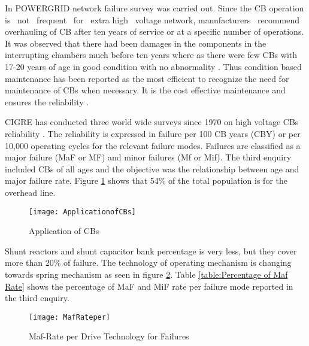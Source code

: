 In POWERGRID network failure survey was carried out. Since the CB operation is~ not~ frequent~ for~ extra high~ voltage network, manufacturers~ recommend overhauling of CB after ten years of service or at a specific number of operations. It was observed that there had been damages in the components in the interrupting chambers much before ten years where as there were few CBs with 17-20 years of age in good condition with no abnormality \cite{sodha2012condition}. Thus condition based maintenance has been reported as the most efficient to recognize the need for maintenance of CBs when necessary. It is the cost effective maintenance and ensures the reliability \cite{long2012online, gungor2012cognitive, moghe2012smart, razi2014circuit, qiang2012high}.

CIGRE has conducted three world wide surveys since 1970 on high voltage CBs reliability \cite{janssen2014international,mazza1981first,cigre1994final,cigre2012final}. The reliability is expressed in failure per 100 CB years (CBY) or per 10,000 operating cycles for the relevant failure modes. Failures are classified as a major failure (MaF or MF) and minor failures (Mf or Mif). The third enquiry included CBs of all ages and the objective was the relationship between age and major failure rate. Figure \ref{fig:Application of CBs} shows that 54\% of the total population is for the overhead line.

\begin{figure}[!htbp]
    \centering
    \texttt{[image: ApplicationofCBs]}
    \caption[Application of CBs]{Application of CBs \cite{janssen2014international}}
    \label{fig:Application of CBs}
\end{figure}

Shunt reactors and shunt capacitor bank percentage is very less, but they cover more than 20\% of failure. The technology of operating mechanism is changing towards spring mechanism as seen in figure \ref{fig:Maf Rate per Drive Technology for Failures [18]}. Table \ref{table:Percentage of Maf Rate} shows the percentage of MaF and MiF rate per failure mode reported in the third enquiry.

\begin{figure}[!htbp]
    \centering
    \texttt{[image: MafRateper]}
    \caption[Maf-Rate per Drive Technology for Failures]{Maf-Rate per Drive Technology for Failures \cite{janssen2014international}}
    \label{fig:Maf Rate per Drive Technology for Failures [18]}
\end{figure}


